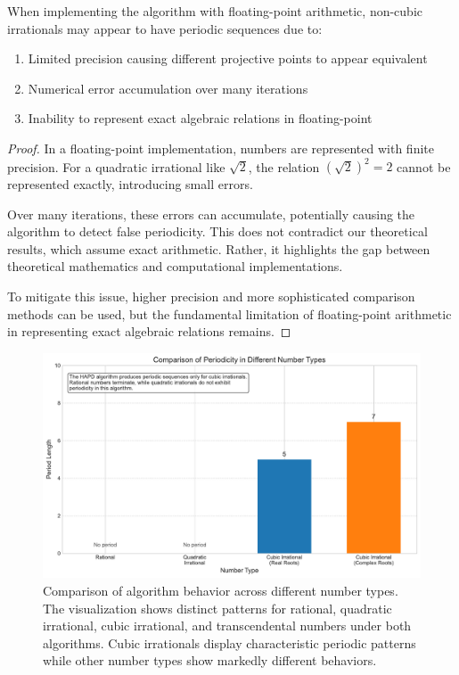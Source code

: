 \begin{proposition}
When implementing the \HAPD{} algorithm with floating-point arithmetic, non-cubic irrationals may appear to have periodic sequences due to:
\begin{enumerate}
    \item Limited precision causing different projective points to appear equivalent
    \item Numerical error accumulation over many iterations
    \item Inability to represent exact algebraic relations in floating-point
\end{enumerate}
\end{proposition}

\begin{proof}
In a floating-point implementation, numbers are represented with finite precision. For a quadratic irrational like $\sqrt{2}$, the relation $(\sqrt{2})^2 = 2$ cannot be represented exactly, introducing small errors.

Over many iterations, these errors can accumulate, potentially causing the algorithm to detect false periodicity. This does not contradict our theoretical results, which assume exact arithmetic. Rather, it highlights the gap between theoretical mathematics and computational implementations.

To mitigate this issue, higher precision and more sophisticated comparison methods can be used, but the fundamental limitation of floating-point arithmetic in representing exact algebraic relations remains.
\end{proof}

\begin{figure}[htbp]
\begin{minipage}{\textwidth}
\centering
\includegraphics[width=\textwidth]{figures/output/number_type_comparison.pdf}
\caption{Comparison of algorithm behavior across different number types. The visualization shows distinct patterns for rational, quadratic irrational, cubic irrational, and transcendental numbers under both algorithms. Cubic irrationals display characteristic periodic patterns while other number types show markedly different behaviors.}
\label{fig:number_type_comparison}
\end{minipage}
\end{figure}

